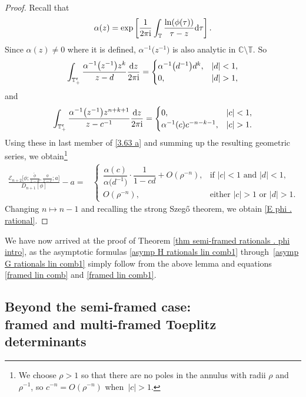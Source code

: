 \documentclass[10pt,a4paper]{amsart}
\numberwithin{equation}{section}
\newcommand{\C}{{\mathbb C}}
\newcommand{\T}{{\mathbb T}}
\newcommand{\al}{\alpha}
\newcommand{\ii}{{\rm i}}
\newcommand{\dd}{{\rm d}}
\begin{document}
\begin{proof}
			Recall that \[			\al(z)=\exp \left[ \frac{1}{2 \pi {\rm i} } \int_{\T} \frac{\ln(\phi(\tau))}{\tau-z}{\rm d}\tau \right].\] Since $\al(z) \neq 0$ where it is defined, $\al^{-1}\big(z^{-1}\big)$ is also analytic in $\C \setminus \T$. So
			\begin{equation*}
				\int_{\T^{\mathfrak{r}}_{+}} \frac{\al^{-1}\big(z^{-1}\big) z^{k}}{z-d} \frac{\dd z}{2 \pi \ii} = \begin{cases}
					\al^{-1}\big(d^{-1}\big) d^{k}, & |d|<1, \\
					0, & |d|>1,
				\end{cases}
			\end{equation*}
			and
			\begin{equation*}
				\int_{\T^{\mathfrak{r}}_{+}} \frac{\al^{-1}\big(z^{-1}\big) z^{n+k+1}}{z-c^{-1}} \frac{\dd z}{2 \pi \ii} = \begin{cases}
					0, & |c|<1, \\
					\al^{-1}(c) c^{-n-k-1}, & |c|>1.
				\end{cases}
			\end{equation*}
			Using these in last member of \eqref{3.63 a} and summing up the resulting geometric series, we obtain\footnote{We choose $\rho>1$ so that there are no poles in the annulus with radii $\rho$ and $\rho^{-1}$, so $c^{-n} = O(\rho^{-n})$ when~${|c|>1}$.}
			\begin{align*}%
					\frac{\mathscr{E}_{n+2}\big[\phi; \tfrac{\tilde{\phi}}{z-d}, \tfrac{\phi}{z-c} ;a\big]}{D_{n+1}[\phi]} - a = & \begin{cases}
						 \dfrac{\al(c)}{\al\big(d^{-1}\big)}\cdot \dfrac{1}{1-cd} + O(\rho^{-n}), 		 & \text{if $|c|<1$ and $|d|<1$}, \\
						O(\rho^{-n}), & \text{either $|c|>1$ or $|d|>1$}.
					\end{cases}
			\end{align*}
			Changing $n \mapsto n-1$ and recalling the strong Szeg\H{o} theorem, we obtain \eqref{E phi . rational}.		
		\end{proof}


We have now arrived at the proof of Theorem \ref{thm semi-framed rationals . phi intro}, as the asymptotic formulas \eqref{asymp H rationals lin comb1} through~\eqref{asymp G rationals lin comb1} simply follow from the above lemma and equations \eqref{framed lin comb} and \eqref{framed lin comb1}.
		
		\subsection[Beyond the semi-framed case: framed and multi-framed Toeplitz determinants]{Beyond the semi-framed case: \\
framed and multi-framed Toeplitz determinants}\label{sec framed and multi-framed}
		
\end{document}
